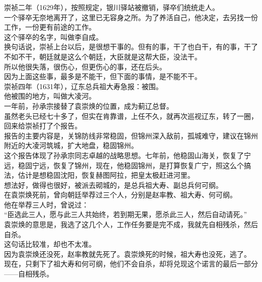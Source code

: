 \begin{multicols}{\theparacolNo}
崇祯二年（1629年），按照规定，银川驿站被撤销，驿卒们统统走人。\\

一个驿卒无奈地离开了，这里已无容身之所。为了养活自己，他决定，去另找一份工作，一份更有前途的工作。\\

这个驿卒的名字，叫做李自成。\\

换句话说，崇祯上台以后，是很想干事的。但有的事，干了也白干，有的事，干了不如不干，朝廷就是这么个朝廷，大臣就是这帮大臣，没法干。\\

所以他很失落，很伤心，但更伤心的事，还在后头。\\

因为上面这些事，最多是不能干，但下面的事情，是不能不干。\\

崇祯四年（1631年），辽东总兵祖大寿急报：被围。\\

他被围的地方，叫做大凌河。\\

一年前，孙承宗接替了袁崇焕的位置，成为蓟辽总督。\\

虽然老头已经七十多了，但实在肯靠谱，上任不久，就再次巡视辽东，转了一圈，回来给崇祯打了个报告。\\

报告的主要内容是，关锦防线非常稳固，但锦州深入敌前，孤城难守，建议在锦州附近的大凌河筑城，扩大地盘，稳固锦州。\\

这个报告体现了孙承宗同志卓越的战略思想。七年前，他稳固山海关，恢复了宁远，稳固宁远，恢复了锦州，现在，他稳固锦州，是打算恢复广宁，照这么个搞法，估计是想稳固沈阳，恢复赫图阿拉，把皇太极赶进河里。\\

想法好，做得也很好，被派去砌城的，是总兵祖大寿、副总兵何可纲。\\

在袁崇焕死前，曾向朝廷举荐过三个人，分别是赵率教、祖大寿、何可纲。\\

他在举荐三人时，曾说过：\\

“臣选此三人，愿与此三人共始终，若到期无果，愿杀此三人，然后自动请死。”\\

袁崇焕的意思是，我选了这几个人，工作任务要是完不成，我就先自相残杀，然后自杀。\\

这句话比较准，却也不太准。\\

因为袁崇焕还没死，赵率教就先死了。袁崇焕死的时候，祖大寿也没死，逃了。\\

现在，只剩下了祖大寿和何可纲，他们不会自杀，却将兑现这个诺言的最后一部分——自相残杀。\\
\ifnum{}
	\end{multicols}
\fi
\newpage
